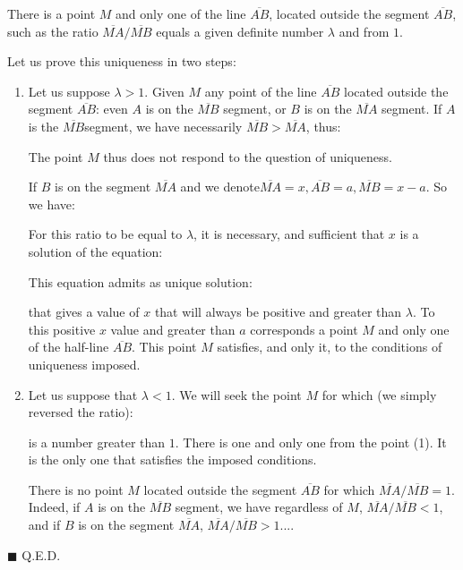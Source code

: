 	\begin{theorem}
	There is a point $M$ and only one of the line $\overline{AB}$, located outside the segment $\overline{AB}$, such as the ratio $\overline{MA}/\overline{MB}$  equals a given definite number $\lambda$ and from $1$.
	\end{theorem}
	\begin{dem} Let us prove this uniqueness in two steps:
	\begin{enumerate}
		\item Let us suppose $\lambda>1$. Given $M$ any point of the line $\overline{AB}$ located outside the segment $\overline{AB}$: even $A$ is on the $\overline{MB}$ segment, or $B$ is on the $\overline{MA}$ segment. If $A$ is the $\overline{MB}$segment, we have necessarily $\overline{MB}>\overline{MA}$, thus:
		
		The point $M$ thus does not respond to the question of uniqueness.
		
		If $B$ is on the segment $\overline{MA}$ and we denote$\overline{MA} = x, \overline{AB} = a, \overline{MB}=x-a$. So we have:
		
		For this ratio to be equal to $\lambda$, it is necessary, and sufficient that $x$ is a solution of the equation:
		
		This equation admits as unique solution:
		
		that gives a value of $x$ that will always be positive and greater than $\lambda$. To this positive $x$ value and greater than $a$ corresponds a point $M$ and only one of the half-line $\overline{AB}$. This point $M$ satisfies, and only it, to the conditions of uniqueness imposed.
		
		\item Let us suppose that $\lambda<1$. We will seek the point $M$ for which (we simply reversed the ratio):
		
		is a number greater than $1$. There is one and only one from the point (1). It is the only one that satisfies the imposed conditions.
	\begin{tcolorbox}[title=Remark,colframe=black,arc=10pt]
	There is no point $M$ located outside the segment $\overline{AB}$ for which $\overline{MA} / \overline{MB} = 1$. Indeed, if $A$ is on the $\overline{MB}$ segment, we have regardless of $M$, $\overline{MA}/\overline{MB}<1$, and if $B$ is on the segment $\overline{MA}$, $\overline{MA}/\overline{MB}>1$....
	\end{tcolorbox}
		
	\end{enumerate}
	\begin{flushright}
		$\blacksquare$  Q.E.D.
	\end{flushright}
	\end{dem}
	
